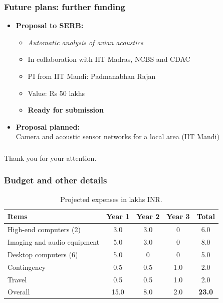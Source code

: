 \documentclass[mathserif]{beamer}
\begin{document}
\begin{frame}
\frametitle{Future plans: further funding}
\begin{itemize}
\item \textbf{Proposal to SERB:} 
	\begin{itemize}
	\item \textit{Automatic analysis of avian acoustics} 
	\item In collaboration with IIT Madras, NCBS and CDAC 
	\item PI from IIT Mandi: Padmanabhan Rajan
	\item Value: Rs 50 lakhs
	\item \textbf{Ready for submission}
	\end{itemize}

\item \textbf{Proposal planned:} \\Camera and acoustic sensor networks for a local area (IIT Mandi)
\end{itemize}
\end{frame}

\begin{frame}
\frametitle{}
\begin{center}
\Large{Thank you for your attention.}
\end{center}
\end{frame}


\begin{frame}
\frametitle{Budget and other details}

\begin{table}[th]
\centering
\caption{Projected expenses in lakhs INR.}
\begin{tabular}{|l|c|c|c|c|}
\hline
Items & Year 1 & Year 2 & Year 3 & Total\\
\hline
High-end computers (2) & 3.0 & 3.0 & 0 & 6.0\\
Imaging and audio equipment & 5.0 & 3.0 & 0 & 8.0 \\
Desktop computers (6) & 5.0 & 0 & 0 & 5.0  \\
Contingency & 0.5 & 0.5 & 1.0 & 2.0 \\
Travel & 0.5 & 0.5 & 1.0 & 2.0\\
\hline
Overall & 15.0 & 8.0 & 2.0 & \textbf{23.0} \\
\hline
\end{tabular}
\label{tab:funding}
\end{table}
\end{frame}
\end{document}
